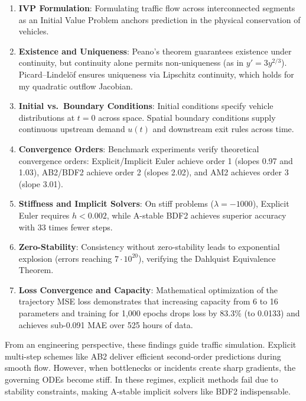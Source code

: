 \documentclass[runningheads]{llncs}
\begin{document}
\begin{enumerate}
    \item \textbf{IVP Formulation}: Formulating traffic flow across interconnected segments as an Initial Value Problem anchors prediction in the physical conservation of vehicles.
    \item \textbf{Existence and Uniqueness}: Peano's theorem guarantees existence under continuity, but continuity alone permits non-uniqueness (as in $y'=3y^{2/3}$). Picard--Lindel\"of ensures uniqueness via Lipschitz continuity, which holds for my quadratic outflow Jacobian.
    \item \textbf{Initial vs.\ Boundary Conditions}: Initial conditions specify vehicle distributions at $t=0$ across space. Spatial boundary conditions supply continuous upstream demand $u(t)$ and downstream exit rules across time.
    \item \textbf{Convergence Orders}: Benchmark experiments verify theoretical convergence orders: Explicit/Implicit Euler achieve order 1 (slopes 0.97 and 1.03), AB2/BDF2 achieve order 2 (slopes 2.02), and AM2 achieves order 3 (slope 3.01).
    \item \textbf{Stiffness and Implicit Solvers}: On stiff problems ($\lambda = -1000$), Explicit Euler requires $h < 0.002$, while A-stable BDF2 achieves superior accuracy with 33 times fewer steps.
    \item \textbf{Zero-Stability}: Consistency without zero-stability leads to exponential explosion (errors reaching $7 \cdot 10^{20}$), verifying the Dahlquist Equivalence Theorem.
    \item \textbf{Loss Convergence and Capacity}: Mathematical optimization of the trajectory MSE loss demonstrates that increasing capacity from 6 to 16 parameters and training for 1,000 epochs drops loss by 83.3\% (to 0.0133) and achieves sub-0.091 MAE over 525 hours of data.
\end{enumerate}

From an engineering perspective, these findings guide traffic simulation. Explicit multi-step schemes like AB2 deliver efficient second-order predictions during smooth flow. However, when bottlenecks or incidents create sharp gradients, the governing ODEs become stiff. In these regimes, explicit methods fail due to stability constraints, making A-stable implicit solvers like BDF2 indispensable.
\end{document}
